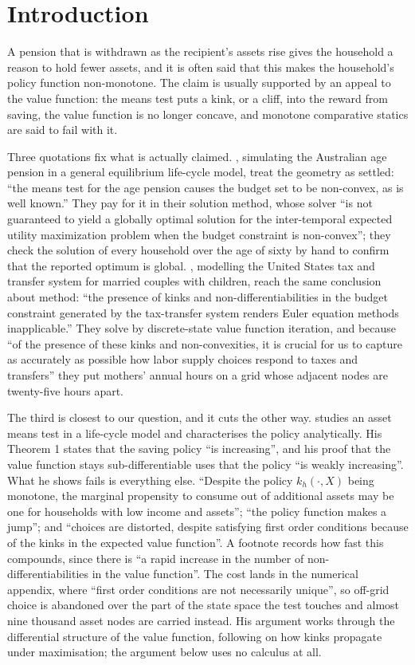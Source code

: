 \section{Introduction}

A pension that is withdrawn as the recipient's assets rise gives the household a reason to hold
fewer assets, and it is often said that this makes the household's policy function non-monotone.
The claim is usually supported by an appeal to the value function: the means test puts a kink, or
a cliff, into the reward from saving, the value function is no longer concave, and monotone
comparative statics are said to fail with it.

Three quotations fix what is actually claimed. \citet{KudrnaWoodland2011}, simulating the
Australian age pension in a general equilibrium life-cycle model, treat the geometry as settled:
``the means test for the age pension causes the budget set to be non-convex, as is well known.''
They pay for it in their solution method, whose solver ``is not guaranteed to yield a globally
optimal solution for the inter-temporal expected utility maximization problem when the budget
constraint is non-convex''; they check the solution of every household over the age of sixty by
hand to confirm that the reported optimum is global. \citet{GarstenauerSiassi2024}, modelling the
United States tax and transfer system for married couples with children, reach the same conclusion
about method: ``the presence of kinks and non-differentiabilities in the budget constraint
generated by the tax-transfer system renders Euler equation methods inapplicable.'' They solve by
discrete-state value function iteration, and because ``of the presence of these kinks and
non-convexities, it is crucial for us to capture as accurately as possible how labor supply
choices respond to taxes and transfers'' they put mothers' annual hours on a grid whose adjacent
nodes are twenty-five hours apart.

The third is closest to our question, and it cuts the other way. \citet{Wellschmied2021} studies
an asset means test in a life-cycle model and characterises the policy analytically. His Theorem 1
states that the saving policy ``is increasing'', and his proof that the value function stays
sub-differentiable uses that the policy ``is weakly increasing''. What he shows fails is
everything else. ``Despite the policy $k_h(\cdot,X)$ being monotone, the marginal propensity to
consume out of additional assets may be one for households with low income and assets''; ``the
policy function makes a jump''; and ``choices are distorted, despite satisfying first order
conditions because of the kinks in the expected value function''. A footnote records how fast this
compounds, since there is ``a rapid increase in the number of non-differentiabilities in the value
function''. The cost lands in the numerical appendix, where ``first order conditions are not
necessarily unique'', so off-grid choice is abandoned over the part of the state space the test
touches and almost nine thousand asset nodes are carried instead. His argument works through the
differential structure of the value function, following \citet{ClausenStrub2020} on how kinks
propagate under maximisation; the argument below uses no calculus at all.

